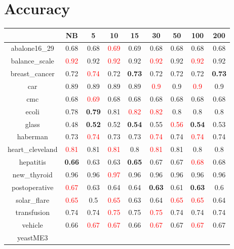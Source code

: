 \documentclass{article}%
\begin{document}
%
\normalsize%
\section*{Accuracy}%
\begin{tabular}{c|cccccccc}%
\hline%
&NB&5&10&15&30&50&100&200\\%
\hline%
abalone16\_29&0.68&0.68&\textcolor{red}{ 
0.69
}&0.69&0.68&0.68&0.68&0.68\\%
\hline%
balance\_scale&\textcolor{red}{ 
0.92
}&0.92&\textcolor{red}{ 
0.92
}&0.92&\textcolor{red}{ 
0.92
}&0.92&\textcolor{red}{ 
0.92
}&0.92\\%
\hline%
breast\_cancer&0.72&\textcolor{red}{ 
0.74
}&0.72&\textbf{0.73}&0.72&0.72&0.72&\textbf{0.73}\\%
\hline%
car&0.89&0.89&0.89&0.89&\textcolor{red}{ 
0.9
}&0.9&\textcolor{red}{ 
0.9
}&0.9\\%
\hline%
cmc&0.68&\textcolor{red}{ 
0.69
}&0.68&0.68&0.68&0.68&0.68&0.68\\%
\hline%
ecoli&0.78&\textbf{0.79}&0.81&\textcolor{red}{ 
0.82
}&\textcolor{red}{ 
0.82
}&0.8&0.8&0.8\\%
\hline%
glass&0.48&\textbf{0.52}&0.52&\textbf{0.54}&0.55&\textcolor{red}{ 
0.56
}&\textbf{0.54}&0.53\\%
\hline%
haberman&0.73&\textcolor{red}{ 
0.74
}&0.73&0.73&\textcolor{red}{ 
0.74
}&0.74&\textcolor{red}{ 
0.74
}&0.74\\%
\hline%
heart\_cleveland&\textcolor{red}{ 
0.81
}&0.81&\textcolor{red}{ 
0.81
}&0.8&\textcolor{red}{ 
0.81
}&0.81&0.8&0.8\\%
\hline%
hepatitis&\textbf{0.66}&0.63&0.63&\textbf{0.65}&0.67&0.67&\textcolor{red}{ 
0.68
}&0.68\\%
\hline%
new\_thyroid&0.96&0.96&\textcolor{red}{ 
0.97
}&0.96&0.96&0.96&0.96&0.96\\%
\hline%
postoperative&\textcolor{red}{ 
0.67
}&0.63&0.64&0.64&\textbf{0.63}&0.61&\textbf{0.63}&0.6\\%
\hline%
solar\_flare&\textcolor{red}{ 
0.65
}&0.5&\textcolor{red}{ 
0.65
}&0.63&0.64&\textcolor{red}{ 
0.65
}&\textcolor{red}{ 
0.65
}&0.64\\%
\hline%
transfusion&0.74&0.74&\textcolor{red}{ 
0.75
}&0.75&\textcolor{red}{ 
0.75
}&0.74&0.74&0.74\\%
\hline%
vehicle&0.66&\textcolor{red}{ 
0.67
}&\textcolor{red}{ 
0.67
}&0.66&\textcolor{red}{ 
0.67
}&0.67&\textcolor{red}{ 
0.67
}&0.67\\%
\hline%
yeastME3&\textcolor{red}{ 
}
\end{tabular}
\end{document}
